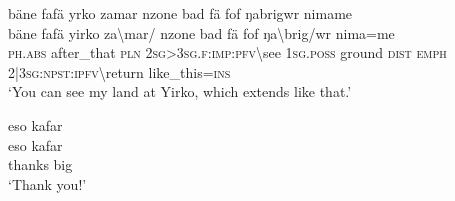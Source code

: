 \ea\label{ex:8:a1886}
bäne fafä yrko zamar nzone bad fä fof ŋabrigwr nimame\\
\gll bäne	fafä	yirko	za{\textbackslash}mar/	nzone	bad	fä	fof	ŋa{\textbackslash}brig/wr	nima=me\\
     \textsc{ph}.\textsc{abs}	after\_that	\textsc{pln}	2\textsc{sg}>3\textsc{sg}.\textsc{f}:\textsc{imp}:\textsc{pfv}{\textbackslash}see	1\textsc{sg}.\textsc{poss}	ground	\textsc{dist}	\textsc{emph}	2|3\textsc{sg}:\textsc{npst}:\textsc{ipfv}{\textbackslash}return	like\_this=\textsc{ins}\\
\glt `You can see my land at Yirko, which extends like that.'
\z

\ea\label{ex:8:a1888}
eso kafar\\
\gll eso	kafar\\
     thanks	big\\
\glt `Thank you!'
\z
